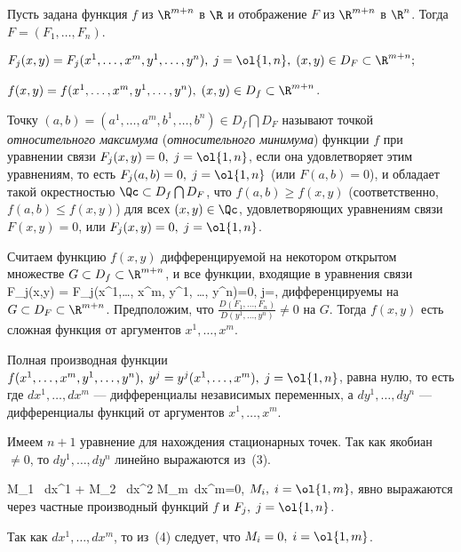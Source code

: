 \documentclass[a4paper]{article}
\newcommand{\emd}[1]{\emph{#1}}
\begin{document}
Пусть задана функция $f$ из $\R^{m+n}$ в $\R$ и отображение $F$ из
$\R^{m+n}$ в $\R^n$. Тогда $F=(F_1,\ldots,F_n)$.

$F_j(x,y) = F_j(x^1,\ldots,x^m, y^1, \ldots, y^n), \; j=\ol{1,n}, \;
(x,y)\in D_F \subset \R^{m+n};$

$f(x,y) = f(x^1,\ldots,x^m, y^1, \ldots, y^n), \; (x,y) \in D_f
\subset \R^{m+n}$.

Точку $(a,b) = (a^1,\ldots,a^m, b^1,\ldots, b^n) \in D_f \bigcap
D_F$ называют точкой \emd{относительного максимума}
(\emd{относительного минимума}) функции $f$ при уравнении
связи $F_j(x,y) = 0, \; j=\ol{1,n}$, если она удовлетворяет этим
уравнениям, то есть $F_j(a,b) = 0, \; j=\ol{1,n}$ (или $F(a,b) =
0$), и обладает такой окрестностью $\Qc \subset D_f\bigcap D_F$, что
$f(a,b) \ge f(x,y)$ (соответственно, $f(a,b) \le f(x,y)$) для всех
$(x,y)\in \Qc$, удовлетворяющих уравнениям связи $F(x,y) = 0$, или
$F_j(x,y) = 0, \; j=\ol{1,n}$.

Считаем функцию $f(x,y)$ дифференцируемой на некотором открытом
множестве $G \subset D_f \subset \R^{m+n}$, и все функции, входящие
в уравнения связи  {F_j(x,y) = F_j(x^1,\ldots, x^m, y^1,
\ldots, y^n)=0, \; j=,} дифференцируемы на $G\subset D_F
\subset \R^{m+n}$. Предположим, что $\frac{ D(F_1,\ldots, F_n)}
{D(y^1, \ldots, y^n)} \ne 0$ на $G$. Тогда $f(x,y)$ есть сложная
функция от аргументов $x^1,\ldots, x^m$.

Полная производная функции $f(x^1,\ldots, x^m, y^1, \ldots, y^n), \;
y^j = y^j(x^1, \ldots, x^m), \; j=\ol{1,n}$, равна нулю, то есть
 где
$dx^1,\ldots,dx^m$ --- дифференциалы независимых переменных, а
$dy^1, \ldots, dy^n$ --- дифференциалы функций от аргументов
$x^1,\ldots,x^m$. 

Имеем $n+1$ уравнение для нахождения стационарных точек. Так как
якобиан $\ne0$, то $dy^1, \ldots, dy^n$ линейно выражаются из~(3).

 {M_1 \, dx^1 + M_2 \, dx^2 \spl M_m\, dx^m=0,} $M_i,
\; i=\ol{1,m},$ явно выражаются через частные производный функций
$f$ и $F_j, \; j=\ol{1,n}$.

Так как $dx^1, \ldots, dx^m$, то из~(4) следует, что $M_i=0, \;
i=\ol{1,m}$.
\end{document}
